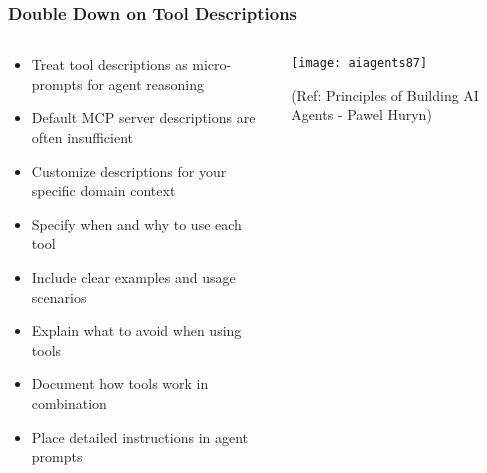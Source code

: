 \begin{frame}[fragile]\frametitle{Double Down on Tool Descriptions}
\begin{columns}
    \begin{column}[T]{0.6\linewidth}
      \begin{itemize}
		\item Treat tool descriptions as micro-prompts for agent reasoning
		\item Default MCP server descriptions are often insufficient
		\item Customize descriptions for your specific domain context
		\item Specify when and why to use each tool
		\item Include clear examples and usage scenarios
		\item Explain what to avoid when using tools
		\item Document how tools work in combination
		\item Place detailed instructions in agent prompts
	  \end{itemize}
    \end{column}
    \begin{column}[T]{0.4\linewidth}
		\begin{center}
		\texttt{[image: aiagents87]}
		
		{\tiny (Ref: Principles of Building AI Agents - Pawel Huryn)}
		\end{center}	
    \end{column}
  \end{columns}
\end{frame}

